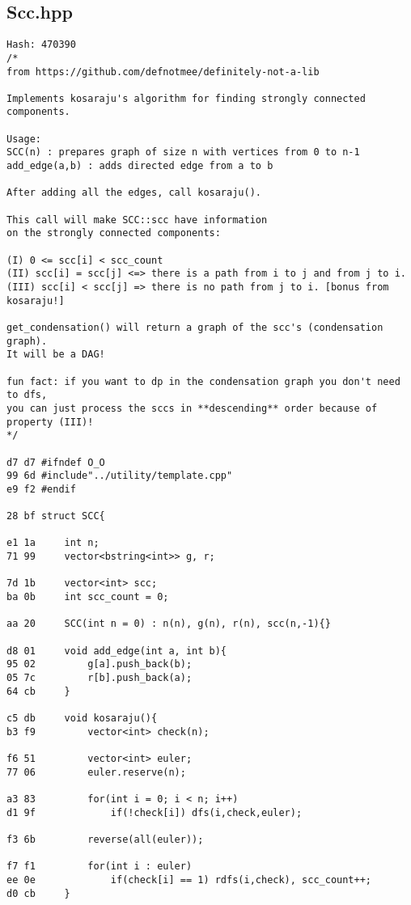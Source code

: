 \documentclass[11pt, a4paper, twoside]{article}
\begin{document}
\subsection{Scc.hpp}
\begin{lstlisting}
Hash: 470390
/*
from https://github.com/defnotmee/definitely-not-a-lib

Implements kosaraju's algorithm for finding strongly connected
components. 

Usage:
SCC(n) : prepares graph of size n with vertices from 0 to n-1
add_edge(a,b) : adds directed edge from a to b

After adding all the edges, call kosaraju().

This call will make SCC::scc have information 
on the strongly connected components:

(I) 0 <= scc[i] < scc_count
(II) scc[i] = scc[j] <=> there is a path from i to j and from j to i.
(III) scc[i] < scc[j] => there is no path from j to i. [bonus from kosaraju!]

get_condensation() will return a graph of the scc's (condensation graph).
It will be a DAG!

fun fact: if you want to dp in the condensation graph you don't need to dfs,
you can just process the sccs in **descending** order because of property (III)!
*/

d7 d7 #ifndef O_O
99 6d #include"../utility/template.cpp"
e9 f2 #endif

28 bf struct SCC{
      
e1 1a     int n;
71 99     vector<bstring<int>> g, r;
      
7d 1b     vector<int> scc;
ba 0b     int scc_count = 0;
      
aa 20     SCC(int n = 0) : n(n), g(n), r(n), scc(n,-1){}
      
d8 01     void add_edge(int a, int b){
95 02         g[a].push_back(b);
05 7c         r[b].push_back(a);
64 cb     }
      
c5 db     void kosaraju(){
b3 f9         vector<int> check(n);
      
f6 51         vector<int> euler;
77 06         euler.reserve(n);
      
a3 83         for(int i = 0; i < n; i++)
d1 9f             if(!check[i]) dfs(i,check,euler);
      
f3 6b         reverse(all(euler));
      
f7 f1         for(int i : euler)
ee 0e             if(check[i] == 1) rdfs(i,check), scc_count++;
d0 cb     }
      

\end{lstlisting}
\end{document}
